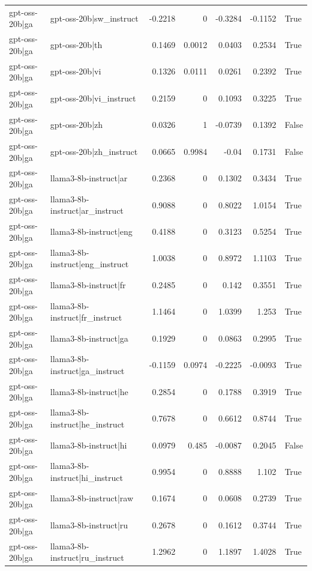 \begin{table}
\begin{tabular}{l l r r r r l}
gpt-oss-20b|ga & gpt-oss-20b|sw_instruct & -0.2218 & 0 & -0.3284 & -0.1152 & True \\
gpt-oss-20b|ga & gpt-oss-20b|th & 0.1469 & 0.0012 & 0.0403 & 0.2534 & True \\
gpt-oss-20b|ga & gpt-oss-20b|vi & 0.1326 & 0.0111 & 0.0261 & 0.2392 & True \\
gpt-oss-20b|ga & gpt-oss-20b|vi_instruct & 0.2159 & 0 & 0.1093 & 0.3225 & True \\
gpt-oss-20b|ga & gpt-oss-20b|zh & 0.0326 & 1 & -0.0739 & 0.1392 & False \\
gpt-oss-20b|ga & gpt-oss-20b|zh_instruct & 0.0665 & 0.9984 & -0.04 & 0.1731 & False \\
gpt-oss-20b|ga & llama3-8b-instruct|ar & 0.2368 & 0 & 0.1302 & 0.3434 & True \\
gpt-oss-20b|ga & llama3-8b-instruct|ar_instruct & 0.9088 & 0 & 0.8022 & 1.0154 & True \\
gpt-oss-20b|ga & llama3-8b-instruct|eng & 0.4188 & 0 & 0.3123 & 0.5254 & True \\
gpt-oss-20b|ga & llama3-8b-instruct|eng_instruct & 1.0038 & 0 & 0.8972 & 1.1103 & True \\
gpt-oss-20b|ga & llama3-8b-instruct|fr & 0.2485 & 0 & 0.142 & 0.3551 & True \\
gpt-oss-20b|ga & llama3-8b-instruct|fr_instruct & 1.1464 & 0 & 1.0399 & 1.253 & True \\
gpt-oss-20b|ga & llama3-8b-instruct|ga & 0.1929 & 0 & 0.0863 & 0.2995 & True \\
gpt-oss-20b|ga & llama3-8b-instruct|ga_instruct & -0.1159 & 0.0974 & -0.2225 & -0.0093 & True \\
gpt-oss-20b|ga & llama3-8b-instruct|he & 0.2854 & 0 & 0.1788 & 0.3919 & True \\
gpt-oss-20b|ga & llama3-8b-instruct|he_instruct & 0.7678 & 0 & 0.6612 & 0.8744 & True \\
gpt-oss-20b|ga & llama3-8b-instruct|hi & 0.0979 & 0.485 & -0.0087 & 0.2045 & False \\
gpt-oss-20b|ga & llama3-8b-instruct|hi_instruct & 0.9954 & 0 & 0.8888 & 1.102 & True \\
gpt-oss-20b|ga & llama3-8b-instruct|raw & 0.1674 & 0 & 0.0608 & 0.2739 & True \\
gpt-oss-20b|ga & llama3-8b-instruct|ru & 0.2678 & 0 & 0.1612 & 0.3744 & True \\
gpt-oss-20b|ga & llama3-8b-instruct|ru_instruct & 1.2962 & 0 & 1.1897 & 1.4028 & True \\

\end{tabular}
\end{table}
